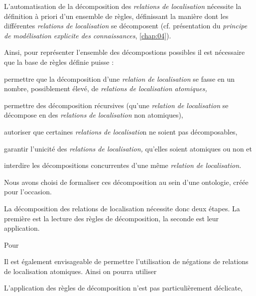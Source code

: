 L'automatisation de la décomposition des \emph{relations de
  localisation} nécessite la définition à priori d'un ensemble de
règles, définissant la manière dont les différentes \emph{relations de
  localisation} se décomposent (cf. présentation du \emph{principe de
  modélisation explicite des connaissances}, \autoref{chap:04}). 

Ainsi, pour représenter l'ensemble des décompostions possibles il est
nécessaire que la base de règles définie puisse :
\begin{enumerate*}[label=(\arabic*)]
\item permettre que la décomposition d'une \emph{relation de
    localisation} se fasse en un nombre, possiblement élevé, de
  \emph{relations de localisation atomiques,}
\item permettre des décomposition récursives (\ie qu'une
  \emph{relation de localisation} se décompose en des \emph{relations
    de localisation} non atomiques),
\item autoriser que certaines \emph{relations de localisatio}n ne soient pas
  décomposables,
\item garantir l'unicité des \emph{relations de localisation,}
  qu'elles soient atomiques ou non et
\item interdire les décompositions concurrentes d'une même
  \emph{relation de localisation.}
\end{enumerate*}


Nous avons choisi de formaliser ces décomposition
au sein d'une ontologie, créée pour l'occasion.

La décomposition des relations de localisation nécessite donc deux
étapes. La première est la lecture des règles de décomposition, la
seconde est leur application.


Pour 







Il est également envisageable de permettre l'utilisation de négations
de relations de localisation atomiques. Ainsi on pourra utiliser




L'application des règles de décomposition n'est pas particulièrement
déclicate, 


